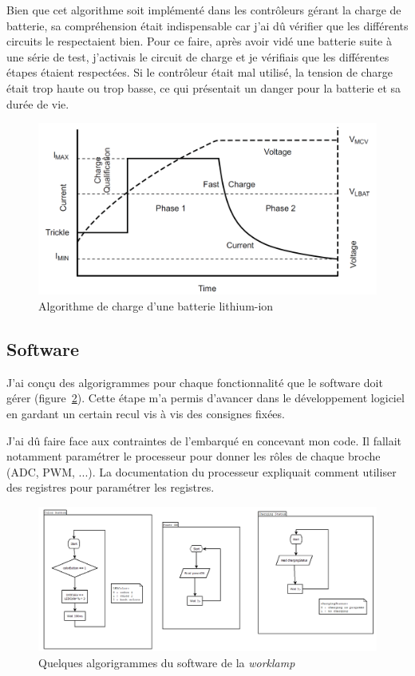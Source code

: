 \documentclass[a4paper, 12pt, sffamily]{report}
\begin{document}
Bien que cet algorithme soit implémenté dans les contrôleurs gérant la charge de batterie, sa compréhension était indispensable car j'ai dû vérifier que les différents circuits le respectaient bien. Pour ce faire, après avoir vidé une batterie suite à une série de test, j'activais le circuit de charge et je vérifiais que les différentes étapes étaient respectées. Si le contrôleur était mal utilisé, la tension de charge était trop haute ou trop basse, ce qui présentait un danger pour la batterie et sa durée de vie.



\begin{figure}[H]
\centering
\includegraphics[scale=0.65]{figures/screenshots/Li-ion_charge_algortihm.png}
\caption{Algorithme de charge d’une batterie lithium-ion \cite{BQ2000_datasheet}} 
\label{fig:li-ion_charge}
\end{figure}

\subsection{Software}
J'ai conçu des algorigrammes pour chaque fonctionnalité que le software doit gérer (figure~\ref{fig:flow_chart}). Cette étape m'a permis d'avancer dans le développement logiciel en gardant un certain recul vis à vis des consignes fixées.

J'ai dû faire face aux contraintes de l'embarqué en concevant mon code. Il fallait notamment paramétrer le processeur pour donner les rôles de chaque broche (ADC, PWM, ...). La documentation du processeur expliquait comment utiliser des registres pour paramétrer les registres. 

\begin{figure}[H]
\centering
\includegraphics[scale=0.7]{figures/screenshots/flow_chart.png}
\caption{Quelques algorigrammes du software de la \emph{worklamp}} 
\label{fig:flow_chart}
\end{figure}
\end{document}
